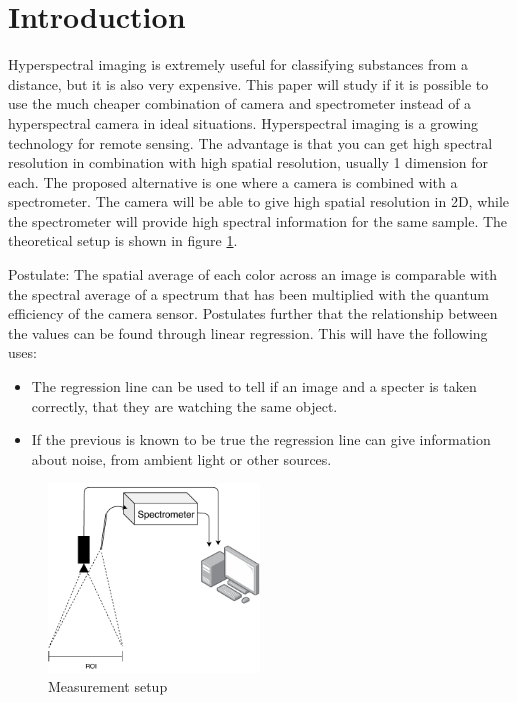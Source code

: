\section{Introduction}
Hyperspectral imaging is extremely useful for classifying substances from a distance, but it is also very expensive. This paper will study if it is possible to use the much cheaper combination of camera and spectrometer instead of a hyperspectral camera in ideal situations. 
Hyperspectral imaging is a growing technology for remote sensing. The advantage is that you can get high spectral resolution in combination with high spatial resolution, usually 1 dimension for each. The proposed alternative is one where a camera is combined with a spectrometer. The camera will be able to give high spatial resolution in 2D, while the spectrometer will provide high spectral information for the same sample. The theoretical setup is shown in figure \ref{fig:measurement_setup}. 

Postulate: 
The spatial average of each color across an image is comparable with the spectral average of a spectrum that has been multiplied with the quantum efficiency of the camera sensor. Postulates further that the relationship between the values can be found through linear regression. This will have the following uses: 
\begin{itemize}
    \item The regression line can be used to tell if an image and a specter is taken correctly, that they are watching the same object. 
    \item If the previous is known to be true the regression line can give information about noise, from ambient light or other sources. 
\end{itemize}


\begin{figure}[h]
    \centering
    \includegraphics[width=0.5\textwidth]{figures/pt_setup.pdf}
    \caption{Measurement setup}
    \label{fig:measurement_setup}
\end{figure}

